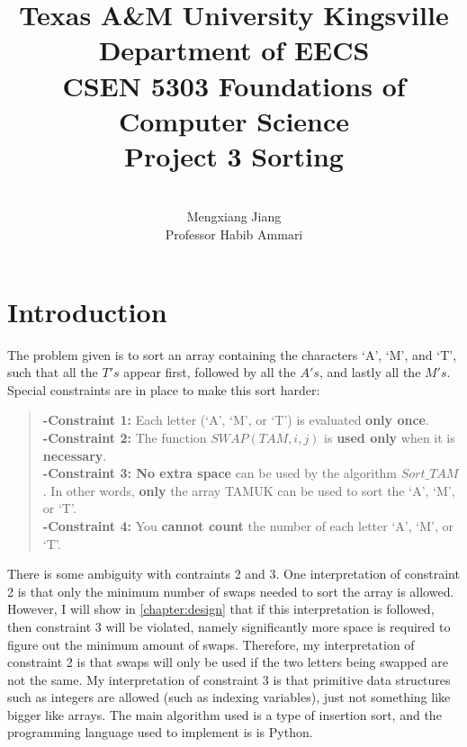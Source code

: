 \documentclass[12pt]{report}
\begin{document}
 
 
\title{Texas A\&M University Kingsville\\
Department of EECS\\
CSEN 5303 Foundations of Computer Science\\
Project 3 Sorting
}%
\author{\\
Mengxiang Jiang\\ %
Professor Habib Ammari} %
 
\maketitle

\tableofcontents

\chapter{Introduction}
The problem given is to sort an array containing the characters `A', `M', and `T',
 such that all the $T's$ appear first, followed by all the $A's$, and lastly all the $M's$.
Special constraints are in place to make this sort harder:
\begin{quote}
\textbf{-Constraint 1:} Each letter (`A', `M', or `T') is evaluated \textbf{only once}.\\
\textbf{-Constraint 2:} The function $SWAP(TAM,i,j)$ is \textbf{used only} when it is \textbf{necessary}.\\
\textbf{-Constraint 3: No extra space} can be used by the algorithm $Sort\_TAM$. In other words,
\textbf{only} the array TAMUK can be used to sort the `A', `M', or `T'.\\
\textbf{-Constraint 4:} You \textbf{cannot count} the number of each letter `A', `M', or `T'.
\end{quote}
There is some ambiguity with contraints 2 and 3. 
One interpretation of constraint 2 is that only the minimum number of swaps needed to sort the array is allowed.
However, I will show in \autoref{chapter:design} that if this interpretation is followed, 
then constraint 3 will be violated, 
namely significantly more space is required to figure out the minimum amount of swaps.
Therefore, my interpretation of constraint 2 is 
that swaps will only be used if the two letters being swapped are not the same.
My interpretation of constraint 3 is that primitive data structures such as integers are allowed (such as indexing variables),
 just not something like bigger like arrays. The main algorithm used is a type of insertion sort, and the programming language used to implement is is Python.
\end{document}
